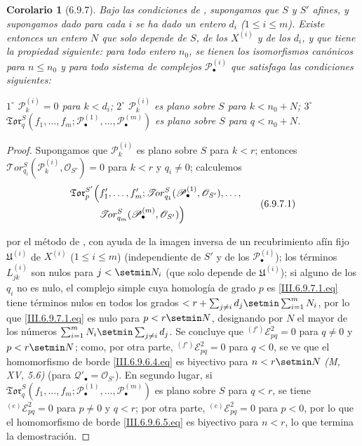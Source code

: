 \documentclass[10pt,oneside,openany]{book}
\theoremstyle{egaenv}\newtheorem*{env}{---}
\theoremstyle{egastatement}
\newtheorem*{corollary}{Corolario}
\theoremstyle{egadescription}
\newcommand{\oldpage}[2][]{\marginnote{\normalfont\scriptsize\textbf{#1}\,|\,#2}\ignorespaces}
\renewcommand{\leq}{\leqslant}
\begin{document}
\begin{corollary}[6.9.7]
\label{III.6.9.7}
Bajo las condiciones de , supongamos que $S$ y $S'$ afines, y supongamos dado para cada $i$ se ha dado un entero $d_i$
($1\leq i\leq m$). Existe entonces un entero $N$ que solo depende de $S$, de
los $X^{(i)}$ y de los $d_i$, y que tiene la propiedad siguiente: para todo
entero $n_0$, se tienen los isomorfismos canónicos  para
$n\leq n_0$ y para todo sistema de complejos
$\mathscr P_\bullet^{(i)}$ que satisfaga las condiciones siguientes:

  $1^\circ$ $\mathscr P_k^{(i)}=0$ para $k<d_i$;
  $2^\circ$ $\mathscr P_k^{(i)}$ es plano sobre $S$ para
  $k<n_0+N$;
  $3^\circ$
  $\mathfrak{Tor}_q^S(f_1,\ldots,f_m;
\mathscr P_\bullet^{(1)},\ldots,\mathscr P_\bullet^{(m)})$ es plano sobre
  $S$ para $q<n_0+N$.

\end{corollary}

\begin{proof}
Supongamos que $\mathscr P_k^{(i)}$ es plano sobre $S$ para $k<r$; entonces
$\mathscr{T}\!or_{q_i}^S(\mathscr P_k^{(i)},\mathscr O_{S'})=0$ para $k<r$
y $q_i\ne0$; calculemos
\[
\begin{split}
  \mathfrak{Tor}_p^{S'}\Bigl(
  &f'_1,\ldots,f'_m;
  \mathscr{T}\!or_{q_1}^S(\mathscr P_\bullet^{(1)},\mathscr O_{S'}),
  \ldots,\\
  &\mathscr{T}\!or_{q_m}^S(\mathscr P_\bullet^{(m)},\mathscr O_{S'})
  \Bigr)
\end{split}
\tag{6.9.7.1}\label{III.6.9.7.1.fr}
\]

\oldpage[III]{170}
por el método de , con ayuda de la imagen inversa de un
recubrimiento afín fijo $\mathfrak U^{(i)}$ de $X^{(i)}$
($1\leq i\leq m$) (independiente de $S'$ y de los
$\mathscr P_\bullet^{(i)}$); los términos $L_{jk}^{(i)}$ son nulos para
$j<\setmin N_i$ (que solo depende de $\mathfrak U^{(i)}$); si alguno de los $q_i$
no es nulo, el complejo simple cuya homología de grado $p$ es
\eqref{III.6.9.7.1.eq} tiene términos nulos en todos los grados
$<r+\sum_{j\ne i}d_j\setmin\sum_{i=1}^m N_i$,
por lo que \eqref{III.6.9.7.1.eq} es nulo para $p<r\setmin N$, designando por $N$
el mayor de los números
$\sum_{i=1}^m N_i\setmin\sum_{j\ne i}d_j$.
Se concluye que ${}^{(f')}\mathscr E_{pq}^2=0$ para $q\ne0$ y $p<r\setmin N$;
como, por otra parte, ${}^{(f')}\mathscr E_{pq}^2=0$ para $q<0$, se ve que el
homomorfismo de borde \eqref{III.6.9.6.4.eq} es biyectivo para $n<r\setmin N$
\emph{(M, XV, 5.6)} (para $\mathscr Q'_\bullet=\mathscr O_{S'}$). En segundo
lugar, si
$\mathfrak{Tor}_q^S
(f_1,\ldots,f_m;
\mathscr P_\bullet^{(1)},\ldots,\mathscr P_\bullet^{(m)})$
es plano sobre $S$ para $q<r$, se tiene
${}^{(e)}\mathscr E_{pq}^2=0$ para $p\ne0$ y $q<r$; por otra parte,
${}^{(e)}\mathscr E_{pq}^2=0$ para $p<0$, por lo que el homomorfismo de borde
\eqref{III.6.9.6.5.eq} es biyectivo para $n<r$, lo que termina la
demostración.
\end{proof}
\end{document}
